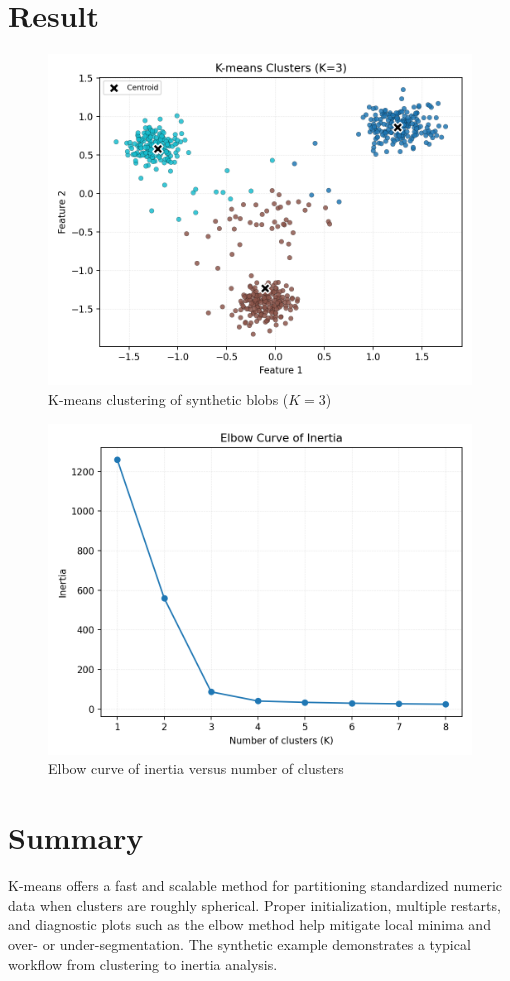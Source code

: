 ﻿\documentclass[12pt]{article}
\begin{document}
\section{Result}
\begin{figure}[H]
  \centering
  \includegraphics[width=0.8\linewidth]{kmeans_clusters.png}
  \caption{K-means clustering of synthetic blobs (\(K=3\))}
  \label{fig:kmeans_clusters}
\end{figure}

\begin{figure}[H]
  \centering
  \includegraphics[width=0.8\linewidth]{kmeans_elbow.png}
  \caption{Elbow curve of inertia versus number of clusters}
  \label{fig:kmeans_elbow}
\end{figure}

\FloatBarrier
\section{Summary}
K-means offers a fast and scalable method for partitioning standardized numeric data when clusters are roughly spherical. Proper initialization, multiple restarts, and diagnostic plots such as the elbow method help mitigate local minima and over- or under-segmentation. The synthetic example demonstrates a typical workflow from clustering to inertia analysis.
\end{document}
